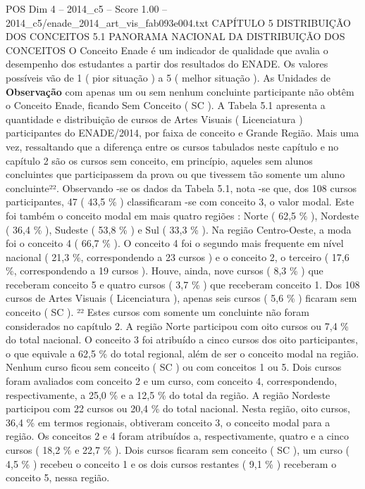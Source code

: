 \begin{textsample}{POS Dim 4 – 2014\_c5 – Score 1.00 – 2014\_c5/enade\_2014\_art\_vis\_fab093e004.txt}  \label{ex:f4_pos_153}
CAPÍTULO 5 DISTRIBUIÇÃO DOS CONCEITOS 5.1 PANORAMA NACIONAL DA DISTRIBUIÇÃO DOS CONCEITOS O Conceito Enade é um indicador de qualidade que avalia o desempenho dos estudantes a partir dos resultados do ENADE.
Os valores possíveis vão de 1 ( pior situação ) a 5 ( melhor situação ).
As Unidades de \textbf{Observação} com apenas um ou sem nenhum concluinte participante não obtêm o Conceito Enade, ficando Sem Conceito ( SC ).
A Tabela 5.1 apresenta a quantidade e distribuição de cursos de Artes Visuais ( Licenciatura ) participantes do ENADE/2014, por faixa de conceito e Grande Região.
Mais uma vez, ressaltando que a diferença entre os cursos tabulados neste capítulo e no capítulo 2 são os cursos sem conceito, em princípio, aqueles sem alunos concluintes que participassem da prova ou que tivessem tão somente um aluno concluinte²².
Observando -se os dados da Tabela 5.1, nota -se que, dos 108 cursos participantes, 47 ( 43,5 \% ) classificaram -se com conceito 3, o valor modal.
Este foi também o conceito modal em mais quatro regiões : Norte ( 62,5 \% ), Nordeste ( 36,4 \% ), Sudeste ( 53,8 \% ) e Sul ( 33,3 \% ).
Na região Centro-Oeste, a moda foi o conceito 4 ( 66,7 \% ).
O conceito 4 foi o segundo mais frequente em nível nacional ( 21,3 \%, correspondendo a 23 cursos ) e o conceito 2, o terceiro ( 17,6 \%, correspondendo a 19 cursos ).
Houve, ainda, nove cursos ( 8,3 \% ) que receberam conceito 5 e quatro cursos ( 3,7 \% ) que receberam conceito 1.
Dos 108 cursos de Artes Visuais ( Licenciatura ), apenas seis cursos ( 5,6 \% ) ficaram sem conceito ( SC ). ²² Estes cursos com somente um concluinte não foram considerados no capítulo 2.
A região Norte participou com oito cursos ou 7,4 \% do total nacional.
O conceito 3 foi atribuído a cinco cursos dos oito participantes, o que equivale a 62,5 \% do total regional, além de ser o conceito modal na região.
Nenhum curso ficou sem conceito ( SC ) ou com conceitos 1 ou 5.
Dois cursos foram avaliados com conceito 2 e um curso, com conceito 4, correspondendo, respectivamente, a 25,0 \% e a 12,5 \% do total da região.
A região Nordeste participou com 22 cursos ou 20,4 \% do total nacional.
Nesta região, oito cursos, 36,4 \% em termos regionais, obtiveram conceito 3, o conceito modal para a região.
Os conceitos 2 e 4 foram atribuídos a, respectivamente, quatro e a cinco cursos ( 18,2 \% e 22,7 \% ).
Dois cursos ficaram sem conceito ( SC ), um curso ( 4,5 \% ) recebeu o conceito 1 e os dois cursos restantes ( 9,1 \% ) receberam o conceito 5, nessa região.

\end{textsample}
